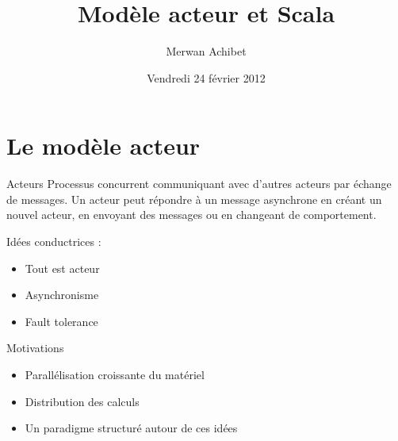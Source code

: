 \documentclass{beamer}
\title{Modèle acteur et Scala}
\author{Merwan Achibet}
\institute{Université du Havre}
\date{Vendredi 24 février 2012}
\begin{document}
\maketitle

\section{Le modèle acteur}

\begin{frame}

  \begin{block}{Acteurs}
    Processus concurrent communiquant avec d'autres acteurs par
    échange de messages. Un acteur peut répondre à un message
    asynchrone en créant un nouvel acteur, en envoyant des messages ou
    en changeant de comportement. \cite{haller}
  \end{block}

  \vfill

  Idées conductrices :

  \begin{itemize}
  \item{Tout est acteur}
  \item{Asynchronisme}
  \item{Fault tolerance}
  \end{itemize}

\end{frame}

\begin{frame}

  \begin{block}{Motivations}
    \begin{itemize}
    \item{Parallélisation croissante du matériel}
    \item{Distribution des calculs}
    \item{Un paradigme structuré autour de ces idées}
    \end{itemize}
  \end{block}

  \vfill

  \begin{figure}

    \centering


    \end{figure}

\end{frame}
\end{document}
